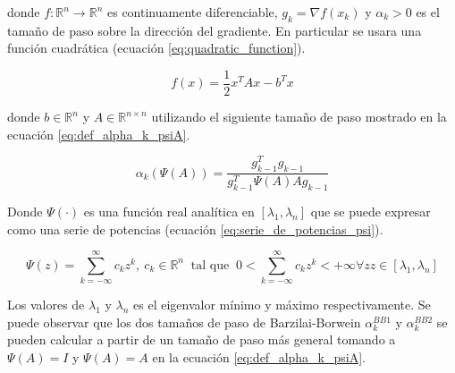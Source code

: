 donde $f:\mathbb{R}^n \rightarrow \mathbb{R}^n$ es continuamente diferenciable, $g_k=\nabla f(x_k)$ y $\alpha_k>0$ es el tamaño de paso sobre la dirección del gradiente. En particular se usara una función cuadrática (ecuación \ref{eq:quadratic_function}).

\begin{equation}
	f(x) = \frac{1}{2}x^TAx- b^Tx \label{eq:quadratic_function}
\end{equation}

donde $b\in\mathbb{R}^n$ y $A\in \mathbb{R}^{n\times n}$ utilizando el siguiente tamaño de paso mostrado en la ecuación \ref{eq:def_alpha_k_psiA}.

\begin{equation}
	\alpha_k(\Psi(A)) = \frac{g_{k-1}^Tg_{k-1}}{g^T_{k-1}\Psi(A)Ag_{k-1}} \label{eq:def_alpha_k_psiA}
\end{equation}

Donde $\Psi(\cdot)$ es una función real analítica en $[\lambda_1, \lambda_n]$ que se puede expresar como una serie de potencias (ecuación \ref{eq:serie_de_potencias_psi}).

\begin{equation}
	\Psi(z) = \sum\limits_{k=-\infty}^{\infty} c_kz^k,\ c_k\in \mathbb{R}^n  \;\; \text{tal que} \;\; 0<\sum_{k =- \infty}^{\infty}c_k z^k<+\infty \forall z z\in[\lambda_1,  \lambda_n]  \label{eq:serie_de_potencias_psi}
\end{equation}

Los valores de $\lambda_1$ y $\lambda_n$ es el eigenvalor mínimo y máximo respectivamente. Se puede observar que los dos tamaños de paso de Barzilai-Borwein $\alpha_k^{BB1}$ y $\alpha_k^{BB2}$ se pueden calcular a partir de un tamaño de paso más general tomando a $\Psi(A) = I$ y $\Psi(A) = A$ en la ecuación \ref{eq:def_alpha_k_psiA}.


